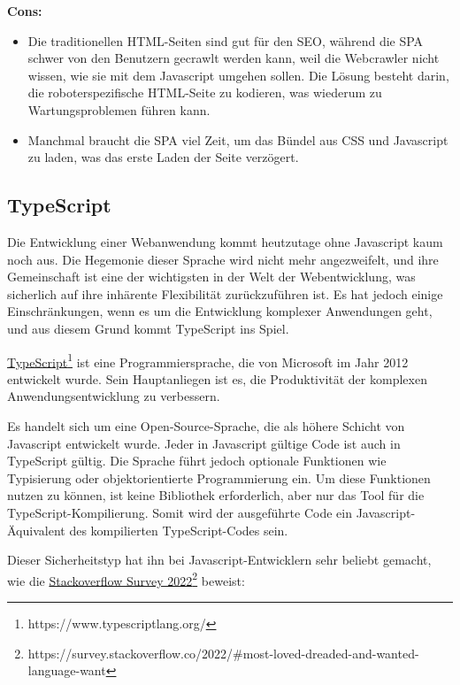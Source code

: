 \textbf{Cons:}

\begin{itemize}
  \item Die traditionellen HTML-Seiten sind gut für den SEO, während die SPA schwer von den Benutzern gecrawlt werden kann, weil die Webcrawler nicht wissen, wie sie mit dem Javascript umgehen sollen. Die Lösung besteht darin, die roboterspezifische HTML-Seite zu kodieren, was wiederum zu Wartungsproblemen führen kann.
  \item Manchmal braucht die SPA viel Zeit, um das Bündel aus CSS und Javascript zu laden, was das erste Laden der Seite verzögert.
\end{itemize}

\subsection{TypeScript}

Die Entwicklung einer Webanwendung kommt heutzutage ohne Javascript kaum noch aus. Die Hegemonie dieser Sprache wird nicht mehr angezweifelt, und ihre Gemeinschaft ist eine der wichtigsten in der Welt der Webentwicklung, was sicherlich auf ihre inhärente Flexibilität zurückzuführen ist. Es hat jedoch einige Einschränkungen, wenn es um die Entwicklung komplexer Anwendungen geht, und aus diesem Grund kommt TypeScript ins Spiel.\cite{tsEssential}

\href{https://www.typescriptlang.org/}{TypeScript}\footnote{https://www.typescriptlang.org/} ist eine Programmiersprache, die von Microsoft im Jahr 2012 entwickelt wurde. Sein Hauptanliegen ist es, die Produktivität der komplexen Anwendungsentwicklung zu verbessern.

Es handelt sich um eine Open-Source-Sprache, die als höhere Schicht von Javascript entwickelt wurde. Jeder in Javascript gültige Code ist auch in TypeScript gültig. Die Sprache führt jedoch optionale Funktionen wie Typisierung oder objektorientierte Programmierung ein. Um diese Funktionen nutzen zu können, ist keine Bibliothek erforderlich, aber nur das Tool für die TypeScript-Kompilierung. Somit wird der ausgeführte Code ein Javascript-Äquivalent des kompilierten TypeScript-Codes sein.

Dieser Sicherheitstyp hat ihn bei Javascript-Entwicklern sehr beliebt gemacht, wie die
\href{https://survey.stackoverflow.co/2022/\#most-loved-dreaded-and-wanted-language-want}{Stackoverflow Survey 2022}\footnote{https://survey.stackoverflow.co/2022/\#most-loved-dreaded-and-wanted-language-want}
beweist:

